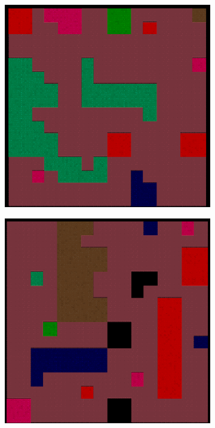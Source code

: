 \begin{figure}[H]
\begin{subfigure}{.5\textwidth}
  \centering
  \includegraphics[width=.8\linewidth]{../images/colored_rooms/1.png}
  \label{fig:sfig1}
\end{subfigure}%
\begin{subfigure}{.5\textwidth}
  \centering
  \includegraphics[width=.8\linewidth]{../images/colored_rooms/2.png}
  \label{fig:sfig2}
\end{subfigure}
\begin{subfigure}{.5\textwidth}
  \centering

\end{subfigure}
\end{figure}
